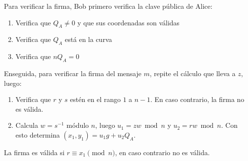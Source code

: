   Para verificar la firma,
  \foreignlanguage{english}{Bob}
  primero verifica la clave pública
  de \foreignlanguage{english}{Alice}:
  \begin{enumerate}
  \item
    Verifica que \(Q_A \ne 0\)
    y que sus coordenadas son válidas
  \item
    Verifica que \(Q_A\) está en la curva
  \item
    Verifica que \(n Q_A = 0\)
  \end{enumerate}
  Enseguida,
  para verificar la firma del mensaje \(m\),
  repite el cálculo que lleva a \(z\),
  luego:
  \begin{enumerate}
  \item
    Verifica que \(r\) y \(s\) estén en el rango \(1\) a \(n - 1\).
    En caso contrario,
    la firma no es válida.
  \item
    Calcula \(w = s^{-1}\) módulo \(n\),
    luego \(u_1 = z w \bmod n\) y \(u_2 = r w \bmod n\).
    Con esto determina \((x_1, y_1) = u_1 g + u_2 Q_A\).
  \end{enumerate}
  La firma es válida si \(r \equiv x_1 \pmod{n}\),
  en caso contrario no es válida.


